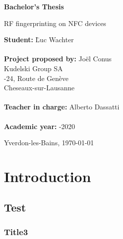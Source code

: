 \documentclass[paper=a4, fontsize=11pt]{scrartcl}
\begin{document}
\begin{titlepage}
  \thispagestyle{firstpage}
  \begin{center}
    \vspace*{5cm}

    \Huge
    \textbf{Bachelor's Thesis}

    \vspace{1.5cm}
    \LARGE
    RF fingerprinting on NFC devices
  \end{center}

  \vspace{6cm}
  \begin{tabbing}
    \linespread{3}\textbf{Student:} \hspace{12em} \= Luc Wachter\\\\

    \textbf{Project proposed by:} \> Joël Conus\\
    \> Kudelski Group SA\\
    -24, Route de Genève\\
     Cheseaux-sur-Lausanne\\\\

    \textbf{Teacher in charge:} \> Alberto Dassatti\\\\

    \textbf{Academic year:} -2020
  \end{tabbing}

  \vspace{3cm}
  \begin{flushright}
    Yverdon-les-Bains, \today
  \end{flushright}
\end{titlepage}

\newpage
\renewcommand{\contentsname}{Table of contents}
\tableofcontents

\newpage
\section{Introduction}
\subsection{Test}
\subsubsection{Title3}
\end{document}
